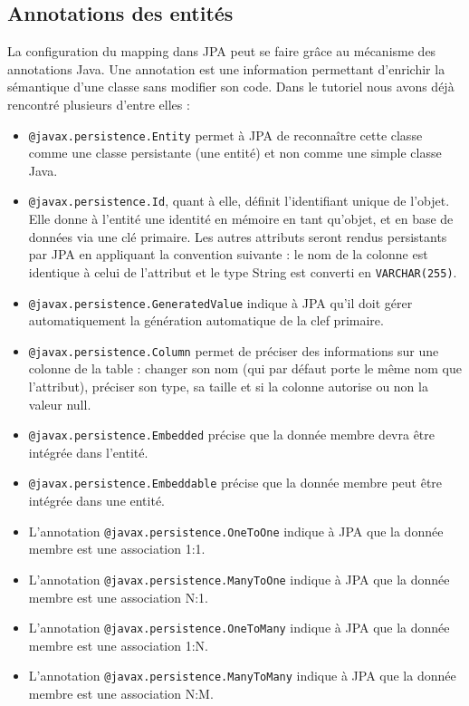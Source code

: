 \documentclass[a4paper,11pt]{article}
\begin{document}
\subsection{Annotations des entités}
La configuration du mapping dans JPA peut se faire grâce au mécanisme des annotations Java. Une annotation est une 
information permettant d'enrichir la sémantique d'une classe sans modifier son code. Dans le tutoriel nous avons déjà 
rencontré plusieurs d'entre elles :
\begin{itemize}
	\item \texttt{@javax.persistence.Entity} permet à JPA de reconnaître cette classe comme une 
	classe persistante (une entité) et non comme une simple classe Java.
	\item \texttt{@javax.persistence.Id}, quant à elle, définit l'identifiant unique de l'objet. Elle donne à 
	l'entité une identité en mémoire en tant qu'objet, et en base de données via une clé primaire. Les autres attributs 
	seront rendus persistants par JPA en appliquant la convention suivante : le nom de la colonne est identique à celui de 
	l'attribut et le type String est converti en \texttt{VARCHAR(255)}.
	\item \texttt{@javax.persistence.GeneratedValue} indique à JPA qu'il doit gérer automatiquement la 
	génération automatique de la clef primaire. 
	\item \texttt{@javax.persistence.Column} permet de préciser des informations sur une colonne de la table : 
	changer son nom (qui par défaut porte le même nom que l’attribut), préciser son type, sa taille et si la colonne 
	autorise ou non la valeur null.
	
	\item \texttt{@javax.persistence.Embedded} précise que la donnée membre devra être intégrée dans l'entité.
	\item \texttt{@javax.persistence.Embeddable} précise que la donnée membre peut être intégrée dans une entité.
	 
	\item L'annotation \texttt{@javax.persistence.OneToOne} indique à JPA que la donnée membre est une association 1:1.
	\item L'annotation \texttt{@javax.persistence.ManyToOne} indique à JPA que la donnée membre est une association N:1.
	\item L'annotation \texttt{@javax.persistence.OneToMany} indique à JPA que la donnée membre est une association 1:N.
	\item L'annotation \texttt{@javax.persistence.ManyToMany} indique à JPA que la donnée membre est une association N:M.
\end{itemize}
\end{document}
